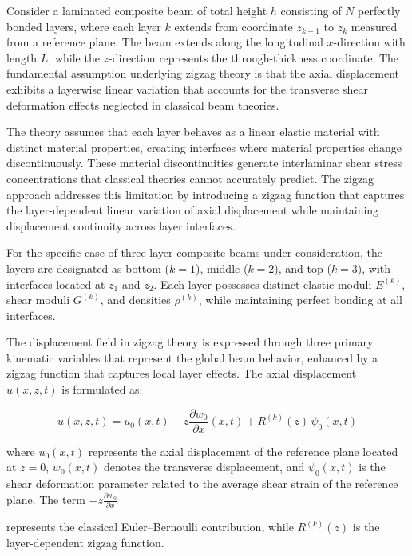 \documentclass[12pt,a4paper]{report}
\begin{document}
Consider a laminated composite beam of total height $h$ consisting of $N$ perfectly bonded layers, where each layer $k$ extends from coordinate $z_{k-1}$ to $z_k$ measured from a reference plane. The beam extends along the longitudinal $x$-direction with length $L$, while the $z$-direction represents the through-thickness coordinate. The fundamental assumption underlying zigzag theory is that the axial displacement exhibits a layerwise linear variation that accounts for the transverse shear deformation effects neglected in classical beam theories.

The theory assumes that each layer behaves as a linear elastic material with distinct material properties, creating interfaces where material properties change discontinuously. These material discontinuities generate interlaminar shear stress concentrations that classical theories cannot accurately predict. The zigzag approach addresses this limitation by introducing a zigzag function that captures the layer-dependent linear variation of axial displacement while maintaining displacement continuity across layer interfaces.

For the specific case of three-layer composite beams under consideration, the layers are designated as bottom ($k=1$), middle ($k=2$), and top ($k=3$), with interfaces located at $z_1$ and $z_2$. Each layer possesses distinct elastic moduli $E^{(k)}$, shear moduli $G^{(k)}$, and densities $\rho^{(k)}$, while maintaining perfect bonding at all interfaces.

The displacement field in zigzag theory is expressed through three primary kinematic variables that represent the global beam behavior, enhanced by a zigzag function that captures local layer effects. The axial displacement $u(x,z,t)$ is formulated as:

\begin{equation}
    u(x,z,t) = u_0(x,t) - z \frac{\partial w_0}{\partial x}(x,t) + R^{(k)}(z) \, \psi_0(x,t)
\end{equation}


where \(u_0(x,t)\) represents the axial displacement of the reference plane located at \(z = 0\), \(w_0(x,t)\) denotes the transverse displacement, and \(\psi_0(x,t)\) is the shear deformation parameter related to the average shear strain of the reference plane. The term \(- z \frac{\partial w_0}{\partial x}\)

represents the classical Euler--Bernoulli contribution, while $R^{(k)}(z)$ is the layer-dependent zigzag function.
\end{document}
